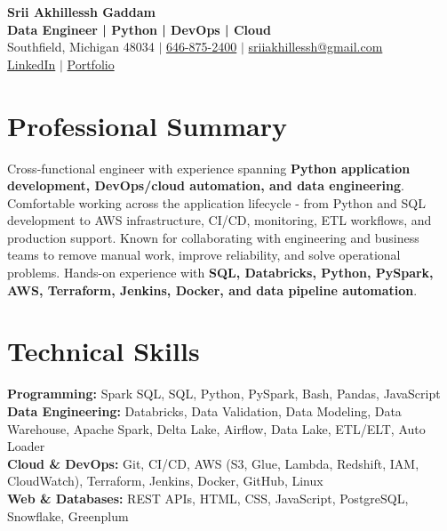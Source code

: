\documentclass[letterpaper,10pt]{article}
\begin{document}
\fontsize{9.35pt}{10.45pt}\selectfont

\begin{center}
    {\LARGE \textbf{Srii Akhillessh Gaddam}} \\[-1pt]
    \textbf{Data Engineer | Python | DevOps | Cloud} \\[2pt]
    Southfield, Michigan 48034 $|$
    \href{tel:6468752400}{646-875-2400} $|$
    \href{mailto:sriiakhillessh@gmail.com}{sriiakhillessh@gmail.com} \\[1pt]
    \href{https://www.linkedin.com/in/srii-akhiilessh-gaddam-b48668191/}{LinkedIn} $|$
    \href{https://sriiakhillesshg.github.io/portfolio/}{Portfolio}
\end{center}
\vspace{-8pt}

\section{Professional Summary}
\small{Cross-functional engineer with experience spanning \textbf{Python application development, DevOps/cloud automation, and data engineering}. Comfortable working across the application lifecycle - from Python and SQL development to AWS infrastructure, CI/CD, monitoring, ETL workflows, and production support. Known for collaborating with engineering and business teams to remove manual work, improve reliability, and solve operational problems. Hands-on experience with \textbf{SQL, Databricks, Python, PySpark, AWS, Terraform, Jenkins, Docker, and data pipeline automation}.}

\section{Technical Skills}
\small{
\textbf{Programming:} Spark SQL, SQL, Python, PySpark, Bash, Pandas, JavaScript \\
\textbf{Data Engineering:} Databricks, Data Validation, Data Modeling, Data Warehouse, Apache Spark, Delta Lake, Airflow, Data Lake, ETL/ELT, Auto Loader \\
\textbf{Cloud \& DevOps:} Git, CI/CD, AWS (S3, Glue, Lambda, Redshift, IAM, CloudWatch), Terraform, Jenkins, Docker, GitHub, Linux \\
\textbf{Web \& Databases:} REST APIs, HTML, CSS, JavaScript, PostgreSQL, Snowflake, Greenplum
}
\end{document}
